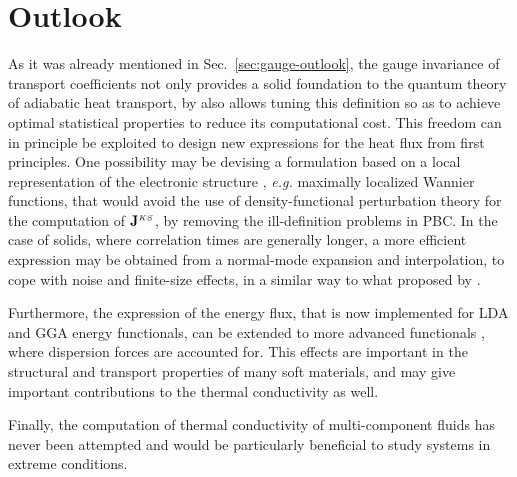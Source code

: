 \section{Outlook}  \label{sec:dft-outlook}
As it was already mentioned in Sec.~\ref{sec:gauge-outlook}, the gauge invariance of transport coefficients not only provides a solid foundation to the quantum theory of adiabatic heat transport, by also allows tuning this definition so as to achieve optimal statistical properties to reduce its computational cost. This freedom can in principle be exploited to design new expressions for the heat flux from first principles. One possibility may be devising a formulation based on a local representation of the electronic structure \cite{Marzari2012,Damle2015}, \emph{e.g.} maximally localized Wannier functions, that would avoid the use of density-functional perturbation theory for the computation of $\mathbf{J}^{{\scriptscriptstyle KS}}$, by removing the ill-definition problems in PBC. In the case of solids, where correlation times are generally longer, a more efficient expression may be obtained from a normal-mode expansion \cite{Ladd1986} and interpolation, to cope with noise and finite-size effects, in a similar way to what proposed by \citet{Carbogno:2017gc}. 

Furthermore, the expression of the energy flux, that is now implemented for LDA and GGA energy functionals, can be extended to more advanced functionals \cite{French_2010:long_range,Berland2015}, where dispersion forces are accounted for. This effects are important in the structural and transport properties of many soft materials, and may give important contributions to the thermal conductivity as well.

Finally, the \abinitio computation of thermal conductivity of multi-component fluids has never been attempted and would be particularly beneficial to study systems in extreme conditions. 
